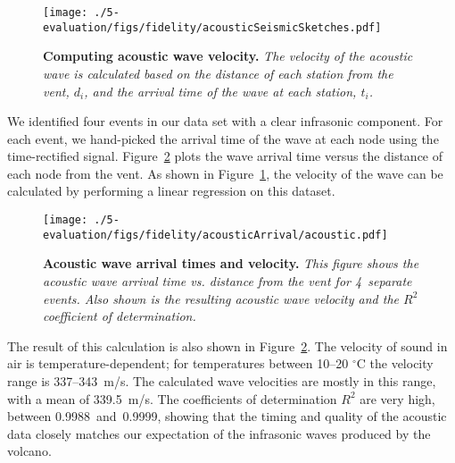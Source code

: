 \begin{figure}[t]
\begin{center}
\texttt{[image: ./5-evaluation/figs/fidelity/acousticSeismicSketches.pdf]}
\end{center}
\caption{\small{\bf Computing acoustic wave velocity.}  
{\em The velocity of the acoustic wave is calculated based on
the distance of each station from the vent, $d_i$, and the 
arrival time of the wave at each station, $t_i$.}}
\label{fig-acousticSketch}
\end{figure}

We identified four events in our data set with a clear infrasonic
component. For each event, we hand-picked the arrival time of the wave
at each node using the time-rectified signal.
Figure~\ref{fig-acousticArrival} plots the wave arrival time versus
the distance of each node from the vent. As shown in
Figure~\ref{fig-acousticSketch}, the velocity of the wave can be 
calculated by performing a linear regression on this dataset.

\begin{figure}[t]
\begin{center}
\texttt{[image: ./5-evaluation/figs/fidelity/acousticArrival/acoustic.pdf]}
\end{center}
\caption{\small{\bf Acoustic wave arrival times and velocity.}
{\em This figure shows the acoustic wave arrival time vs. distance
from the vent for 4~separate events. Also shown is the resulting
acoustic wave velocity and the $R^2$ coefficient of determination.}}
\label{fig-acousticArrival}
\end{figure}

The result of this calculation is also shown in
Figure~\ref{fig-acousticArrival}.  The velocity of sound in air is
temperature-dependent; for temperatures between 10--20 $^{\circ}$C
the velocity range is 337--343~m/s.  The calculated wave velocities are
mostly in this range, with a mean of 339.5~m/s. The coefficients of
determination $R^2$ are very high, between
0.9988~and~0.9999, showing that the timing and quality of the
acoustic data closely matches our expectation
of the infrasonic waves produced by the volcano.

